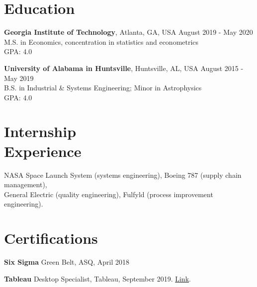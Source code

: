 \documentclass[margin, line]{res}
\begin{document}
\begin{resume}
\section{\sc Education}

{\bf Georgia Institute of Technology}, Atlanta, GA, USA \hfill August 2019 - May 2020\\
M.S. in Economics, concentration in statistics and econometrics\\
GPA: 4.0

\vspace{-1mm}

{\bf University of Alabama in Huntsville}, Huntsville, AL, USA \hfill August 2015 - May 2019 \\
B.S. in Industrial \& Systems Engineering; Minor in Astrophysics\\
GPA: 4.0


\vspace{-1mm}
\section{\sc Internship \\ Experience}
NASA Space Launch System (systems engineering), Boeing 787 (supply chain management), \\ General Electric (quality engineering), Fulfyld (process improvement engineering). 



\section{\sc Certifications}
{\bf Six Sigma} Green Belt, ASQ, April 2018
\vspace*{-3mm}

{\bf Tableau} Desktop Specialist, Tableau, September 2019. \href{https://www.credly.com/badges/e9a605a8-1977-4a1c-ab24-149a37c7fb36/linked_in_profile}{Link}.
\vspace*{-3mm}

\end{resume}
\end{document}
